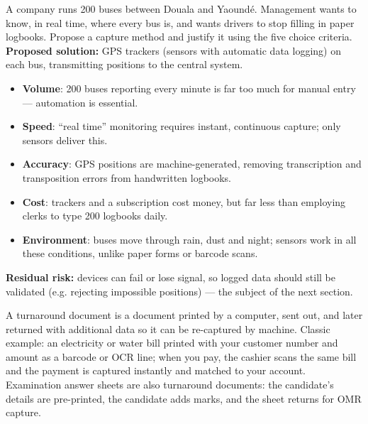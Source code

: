 \documentclass[11pt]{article}
\newcommand{\cle}[1]{{\popxbold\color{popdark}#1}}
\begin{document}
\begin{exoresolu}
A company runs 200 buses between Douala and Yaound\'e. Management wants to know, in real time, where every bus is, and wants drivers to stop filling in paper logbooks. Propose a capture method and justify it using the five choice criteria.
\tcblower
\textbf{Proposed solution:} GPS trackers (sensors with automatic data logging) on each bus, transmitting positions to the central system.
\begin{itemize}
\item \textbf{Volume}: 200 buses reporting every minute is far too much for manual entry --- automation is essential.
\item \textbf{Speed}: ``real time'' monitoring requires instant, continuous capture; only sensors deliver this.
\item \textbf{Accuracy}: GPS positions are machine-generated, removing transcription and transposition errors from handwritten logbooks.
\item \textbf{Cost}: trackers and a subscription cost money, but far less than employing clerks to type 200 logbooks daily.
\item \textbf{Environment}: buses move through rain, dust and night; sensors work in all these conditions, unlike paper forms or barcode scans.
\end{itemize}
\textbf{Residual risk:} devices can fail or lose signal, so logged data should still be validated (e.g. rejecting impossible positions) --- the subject of the next section.
\end{exoresolu}

\begin{savaistu}
A \cle{turnaround document} is a document printed by a computer, sent out, and later returned with additional data so it can be re-captured by machine. Classic example: an electricity or water bill printed with your customer number and amount as a barcode or OCR line; when you pay, the cashier scans the same bill and the payment is captured instantly and matched to your account. Examination answer sheets are also turnaround documents: the candidate's details are pre-printed, the candidate adds marks, and the sheet returns for OMR capture.
\end{savaistu}
\end{document}
